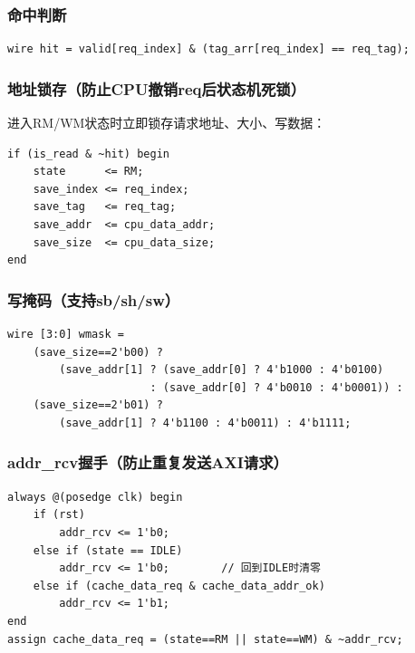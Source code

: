 \subsubsection{命中判断}

\begin{verbatim}
wire hit = valid[req_index] & (tag_arr[req_index] == req_tag);
\end{verbatim}

\subsubsection{地址锁存（防止CPU撤销req后状态机死锁）}

进入RM/WM状态时立即锁存请求地址、大小、写数据：
\begin{verbatim}
if (is_read & ~hit) begin
    state      <= RM;
    save_index <= req_index;
    save_tag   <= req_tag;
    save_addr  <= cpu_data_addr;
    save_size  <= cpu_data_size;
end
\end{verbatim}

\subsubsection{写掩码（支持sb/sh/sw）}

\begin{verbatim}
wire [3:0] wmask =
    (save_size==2'b00) ?
        (save_addr[1] ? (save_addr[0] ? 4'b1000 : 4'b0100)
                      : (save_addr[0] ? 4'b0010 : 4'b0001)) :
    (save_size==2'b01) ?
        (save_addr[1] ? 4'b1100 : 4'b0011) : 4'b1111;
\end{verbatim}

\subsubsection{addr\_rcv握手（防止重复发送AXI请求）}

\begin{verbatim}
always @(posedge clk) begin
    if (rst)
        addr_rcv <= 1'b0;
    else if (state == IDLE)
        addr_rcv <= 1'b0;        // 回到IDLE时清零
    else if (cache_data_req & cache_data_addr_ok)
        addr_rcv <= 1'b1;
end
assign cache_data_req = (state==RM || state==WM) & ~addr_rcv;
\end{verbatim}
